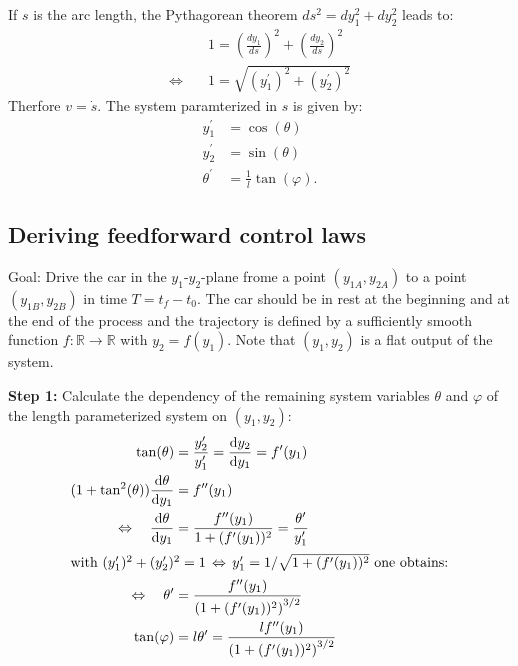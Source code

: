 \documentclass[a4paper,11pt,headings=standardclasses,parskip=half]{scrartcl}
\newcommand{\yIZ}{y_{1A}}
\newcommand{\yIIZ}{y_{2A}}
\newcommand{\yIT}{y_{1B}}
\newcommand{\yIIT}{y_{2B}}
\newcommand{\diff}[2]{\frac{\text{d}#1}{\text{d}#2}}
\begin{document}
If $s$ is the arc length, the Pythagorean theorem $ds^2 = dy_1^2 + dy_2^2$ leads to:
\begin{subequations}
\begin{align}
&1 = \left(\frac{dy_1}{ds}\right)^2 + \left(\frac{dy_2}{ds}\right)^2  \\
\Leftrightarrow \quad & 1 = \sqrt{(y_1^\prime)^2+(y_2^\prime)^2}
\end{align}
\end{subequations}
Therfore $v=\dot s$. 
The system paramterized in $s$ is given by:
\begin{subequations}
\begin{align}
y_1^\prime &= \cos(\theta)\\
y_2^\prime &= \sin(\theta)\\
\theta^\prime &= \frac{1}{l}\tan(\varphi).
\end{align}
\end{subequations}
\subsection{Deriving feedforward control laws}
Goal: Drive the car in the $y_1$-$y_2$-plane frome a point $(\yIZ, \yIIZ)$ to a point $(\yIT, \yIIT)$ in time $T=t_f-t_0$. The car should be in rest at the beginning and at the end of the process and the trajectory is defined by a sufficiently smooth function $f : \mathbb{R} \to \mathbb{R}$ with $y_2 = f(y_1)$. Note that $(y_1, y_2)$ is a flat output of the system.

\textbf{Step 1:} Calculate the dependency of the remaining system variables $\theta$ and $\varphi$ of the  length parameterized system on $(y_1, y_2)$:
\begin{align}
\tan(\theta) &= \frac{y_2^\prime}{y_1^\prime} = \diff{y_2}{y_1} = f^\prime(y_1)\\
(1 + \tan^2(\theta))\diff{\theta}{y_1} &= f^{\prime\prime}(y_1) \nonumber \\
\Leftrightarrow \quad \diff{\theta}{y_1}&= \frac{f^{\prime\prime}(y_1)}{1 + (f^\prime(y_1))^2} = \frac{\theta^\prime}{y_1^\prime} \nonumber\\
\intertext{with $(y_1^\prime)^2 + (y_2^\prime)^2 = 1 \, \Leftrightarrow \, y_1^\prime = 1/\sqrt{1 + (f^\prime(y_1))^2}$ one obtains:}
\Leftrightarrow \quad \theta^\prime &= \frac{f^{\prime\prime}(y_1)}{\left(1 + (f^\prime(y_1))^2\right)^{3/2}}\\
\tan(\varphi) &= l\theta^\prime = \frac{lf^{\prime\prime}(y_1)}{\left(1 + (f^\prime(y_1))^2\right)^{3/2}}
\end{align}
\end{document}

